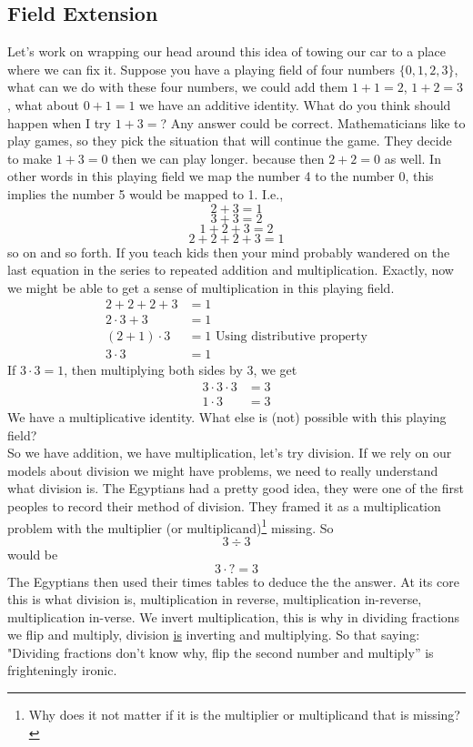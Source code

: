\documentclass[12pt]{article}
\begin{document}
\subsection*{Field Extension}
Let's work on wrapping our head around this idea of towing our car to a place where we can fix it.  Suppose you have a playing field of four numbers $\{0, 1, 2, 3\}$, what can we do with these four numbers, we could add them $1+1=2$, $1+2=3$, what about $0+1=1$  we have an additive identity.  What do you think should happen when I try $1+3=$?  Any answer could be correct.  Mathematicians like to play games, so they pick the situation that will continue the game.  They decide to make $1+3=0$ then we can play longer. because then $2+2=0$ as well.  In other words in this playing field we map the number 4 to the number 0, this implies the number 5 would be mapped to 1.  I.e., $$2+3=1$$ $$3+3=2$$ $$1+2+3=2$$ $$2+2+2+3=1$$ so on and so forth.  If you teach kids then your mind probably wandered on the last equation in the series to repeated addition and multiplication.  Exactly, now we might be able to get a sense of multiplication in this playing field.
\begin{align*}
2+2+2+3 &=1 \\
2 \cdot 3 +3 &= 1 \\
(2+1) \cdot 3 &= 1 \text{ Using distributive property} \\
3 \cdot 3 &= 1
\end{align*}
If $3 \cdot 3 = 1$, then multiplying both sides by 3, we get
\begin{align*}
3 \cdot 3 \cdot 3 &= 3 \\
1 \cdot 3 &= 3
\end{align*}
We have a multiplicative identity.  What else is (not) possible with this playing field?\\

So we have addition, we have multiplication, let's try division.  If we rely on our models about division we might have problems, we need to really understand what division is.  The Egyptians had a pretty good idea, they were one of the first peoples to record their method of division.  They framed it as a multiplication problem with the multiplier (or multiplicand)\footnote{Why does it not matter if it is the multiplier or multiplicand that is missing?} missing. So $$3 \div 3$$ would be $$3 \cdot ? = 3$$  
The Egyptians then used their times tables to deduce the the answer.  At its core this is what division is, multiplication in reverse, multiplication in-reverse, multiplication in-verse.  We invert multiplication, this is why in dividing fractions we flip and multiply, division \underline{is} inverting and multiplying.  So that saying: "Dividing fractions don't know why, flip the second number and multiply'' is frighteningly ironic.\\
\end{document}

